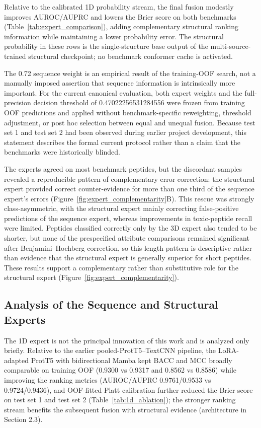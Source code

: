 \documentclass[12pt]{article}
\begin{document}
Relative to the calibrated 1D probability stream, the final fusion modestly
improves AUROC/AUPRC and lowers the Brier score on both benchmarks
(Table~\ref{tab:expert_comparison}), adding complementary structural ranking
information while maintaining a lower probability error. The structural
probability in these rows is the single-structure base output of the
multi-source-trained structural checkpoint; no benchmark conformer cache is
activated.

The 0.72 sequence weight is an empirical result of the training-OOF search,
not a manually imposed assertion that sequence information is intrinsically
more important. For the current canonical evaluation, both expert weights and
the full-precision decision threshold of 0.47022256531284556 were frozen from
training OOF predictions and applied without benchmark-specific reweighting,
threshold adjustment, or post hoc selection between equal and unequal fusion.
Because test set 1 and test set 2 had been observed during earlier project development,
this statement describes the formal current protocol rather than a claim that
the benchmarks were historically blinded.

The experts agreed on most benchmark peptides, but the discordant samples
revealed a reproducible pattern of complementary error correction: the
structural expert provided correct counter-evidence for more than one third
of the sequence expert's errors (Figure~\ref{fig:expert_complementarity}B).
This rescue was strongly class-asymmetric, with the structural expert mainly
correcting false-positive predictions of the sequence expert, whereas
improvements in toxic-peptide recall were limited. Peptides classified
correctly only by the 3D expert also tended to be shorter, but none of the
prespecified attribute comparisons remained significant after
Benjamini--Hochberg correction, so this length pattern is descriptive rather
than evidence that the structural expert is generally superior for short
peptides. These results support a complementary rather than substitutive role
for the structural expert (Figure~\ref{fig:expert_complementarity}).
\subsection{Analysis of the Sequence and Structural Experts}
The 1D expert is not the principal innovation of this work and is analyzed
only briefly. Relative to the earlier pooled-ProtT5--TextCNN pipeline, the
LoRA-adapted ProtT5 with bidirectional Mamba kept BACC and MCC broadly
comparable on training OOF (0.9300 vs 0.9317 and 0.8562 vs 0.8586) while
improving the ranking metrics (AUROC/AUPRC 0.9761/0.9533 vs 0.9724/0.9436),
and OOF-fitted Platt calibration further reduced the Brier score on test set 1 and
test set 2 (Table~\ref{tab:1d_ablation}); the stronger ranking stream benefits the
subsequent fusion with structural evidence (architecture in Section 2.3).
\end{document}
